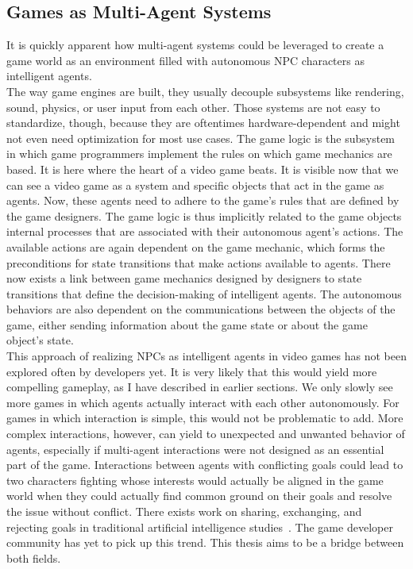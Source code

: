 \subsection{Games as Multi-Agent Systems}
It is quickly apparent how multi-agent systems could be leveraged to create a game world as an environment filled with autonomous NPC characters as intelligent agents.\\
The way game engines are built, they usually decouple subsystems like rendering, sound, physics, or user input from each other. Those systems are not easy to standardize, though, because they are oftentimes hardware-dependent and might not even need optimization for most use cases. The game logic is the subsystem in which game programmers implement the rules on which game mechanics are based. It is here where the heart of a video game beats. It is visible now that we can see a video game as a system and specific objects that act in the game as agents. Now, these agents need to adhere to the game’s rules that are defined by the game designers. The game logic is thus implicitly related to the game objects internal processes that are associated with their autonomous agent’s actions. The available actions are again dependent on the game mechanic, which forms the preconditions for state transitions that make actions available to agents. There now exists a link between game mechanics designed by designers to state transitions that define the decision-making of intelligent agents. The autonomous behaviors are also dependent on the communications between the objects of the game, either sending information about the game state or about the game object’s state.~\cite{MarinLora2020}\\
This approach of realizing NPCs as intelligent agents in video games has not been explored often by developers yet. It is very likely that this would yield more compelling gameplay, as I have described in earlier sections. We only slowly see more games in which agents actually interact with each other autonomously. For games in which interaction is simple, this would not be problematic to add. More complex interactions, however, can yield to unexpected and unwanted behavior of agents, especially if multi-agent interactions were not designed as an essential part of the game. Interactions between agents with conflicting goals could lead to two characters fighting whose interests would actually be aligned in the game world when they could actually find common ground on their goals and resolve the issue without conflict. There exists work on sharing, exchanging, and rejecting goals in traditional artificial intelligence studies~\cite{Kraus1997}. The game developer community has yet to pick up this trend. This thesis aims to be a bridge between both fields.~\cite{Dignum2009}\\
